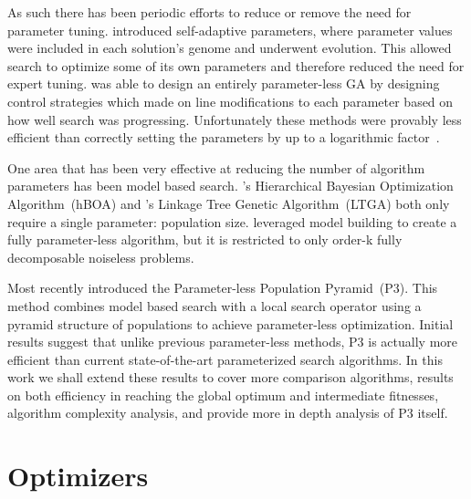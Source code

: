 \documentclass[twoside]{article}
\begin{document}
As such there has been periodic efforts to reduce or remove the need for parameter tuning.
\cite{Back:1992:selfadapt} introduced self-adaptive parameters, where parameter values
were included in each solution's genome and underwent evolution. This allowed search
to optimize some of its own parameters and therefore reduced the need for expert tuning.
\cite{harik:1999:parameterlessga} was able to design an entirely parameter-less GA by
designing control strategies which made on line modifications to each parameter based
on how well search was progressing. Unfortunately these methods were provably less efficient
than correctly setting the parameters by up to a logarithmic
factor~\citep{pelikan:1999:worstparameter-less}.

One area that has been very effective at reducing the number of algorithm parameters has been
model based search. \cite{pelikan:2006:hboa}'s Hierarchical Bayesian Optimization
Algorithm~(hBOA) and \cite{thierens:2010:ltga}'s Linkage Tree Genetic Algorithm~(LTGA)
both only require a single parameter: population size. \cite{posik:2011:parameterless}
leveraged model building to create a fully parameter-less algorithm, but it is restricted to
only order-k fully decomposable noiseless problems.

Most recently \cite{goldman:2014:p3} introduced the Parameter-less Population Pyramid~(P3).
This method combines model based search with a local search operator using a pyramid structure
of populations to achieve parameter-less optimization. Initial results suggest that unlike
previous parameter-less methods, P3 is actually more efficient than current state-of-the-art
parameterized search algorithms. In this work we shall extend these results to cover more
comparison algorithms, results on both efficiency in reaching the global optimum and intermediate
fitnesses, algorithm complexity analysis, and provide more in depth analysis of P3 itself.
\begin{comment}
Section~\ref{sec-optimizers}
explains how each of these algorithms, including P3, perform search. Section~\ref{sec-problems}
provides a description of each test problem. As hBOA and LTGA require a population size parameter
Section~\ref{sec-tuning} provides our methodology to ensure each is optimally tuned to each problem.
\end{comment}

\section{Optimizers}
\label{sec-optimizers}
\end{document}
